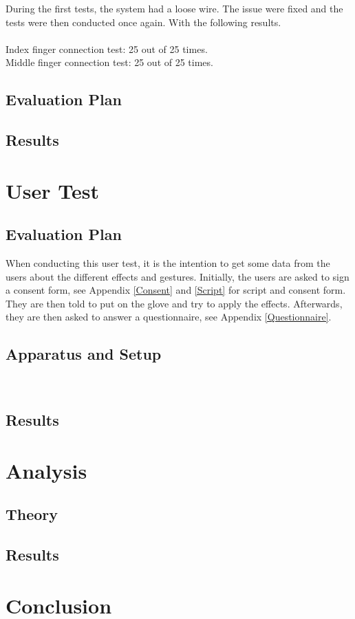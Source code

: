 During the first tests, the system had a loose wire. The issue were fixed and the tests were then conducted once again. With the following results.\\\\

Index finger connection test: 25 out of 25 times. \\
Middle finger connection test: 25 out of 25 times. \\



\subsection{Evaluation Plan}

\subsection{Results}


\section{User Test}

\subsection{Evaluation Plan}

When conducting this user test, it is the intention to get some data from the users about the different effects and gestures. 
Initially, the users are asked to sign a consent form, see Appendix \ref{Consent} and \ref{Script} for script and consent form. They are then told to put on the glove and try to apply the effects. Afterwards, they are then asked to answer a questionnaire, see Appendix \ref{Questionnaire}. 

\subsection{Apparatus and Setup}



\begin{minipage}{\linewidth}%
\label{Setup}
\end{minipage}\\

\subsection{Results}


\section{Analysis}

\subsection{Theory}

\subsection{Results}


\section{Conclusion}